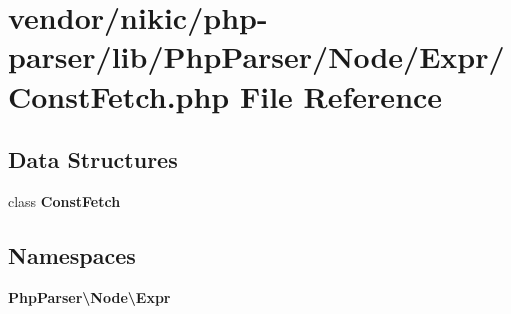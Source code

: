 \section{vendor/nikic/php-\/parser/lib/\+Php\+Parser/\+Node/\+Expr/\+Const\+Fetch.php File Reference}
\label{_const_fetch_8php}
\subsection*{Data Structures}
\begin{DoxyCompactItemize}
\item 
class {\bf Const\+Fetch}
\end{DoxyCompactItemize}
\subsection*{Namespaces}
\begin{DoxyCompactItemize}
\item 
 {\bf Php\+Parser\textbackslash{}\+Node\textbackslash{}\+Expr}
\end{DoxyCompactItemize}

